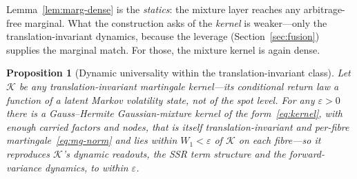 \documentclass[11pt]{article}
\newtheorem{proposition}[theorem]{Proposition}
\newcommand{\cK}{\mathcal{K}}
\begin{document}
Lemma~\ref{lem:marg-dense} is the \emph{statics}: the mixture layer reaches any arbitrage-free marginal.
What the construction asks of the \emph{kernel} is weaker---only the translation-invariant dynamics,
because the leverage (Section~\ref{sec:fusion}) supplies the marginal match. For those, the mixture
kernel is again dense.

\begin{proposition}[Dynamic universality within the translation-invariant class]\label{prop:dyn-dense}
Let $\cK$ be any translation-invariant martingale kernel---its conditional return law a function of a
latent Markov volatility state, not of the spot level. For any $\varepsilon>0$ there is a
Gauss--Hermite Gaussian-mixture kernel of the form~\eqref{eq:kernel}, with enough carried factors and
nodes, that is itself translation-invariant and per-fibre martingale~\eqref{eq:mg-norm} and lies within
$W_1<\varepsilon$ of $\cK$ on each fibre---so it reproduces $\cK$'s dynamic readouts, the SSR term
structure and the forward-variance dynamics, to within $\varepsilon$.
\end{proposition}
\end{document}
